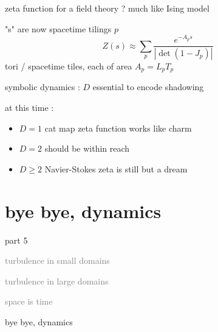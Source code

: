 %
%



\begin{frame}{zeta function for a field theory ? much like Ising model}
\begin{block}{"\po s" are now spacetime tilings $p$}
\[
Z(s) \approx
\sum_{p} \frac{e^{-A_p s}}
              {\left|\det(1-J_p)\right|}
\]
tori / spacetime tiles,
each of area $A_p = L_p T_p$
\end{block}
\begin{block}{symbolic dynamics : $D$\dmn}
essential to encode shadowing
\end{block}

\vfill
at this time :
\begin{itemize}
\item $D=1$ cat map zeta function works like charm
\item $D=2$ {\catlatt} should be within reach
\item $D\geq2$ Navier-Stokes  zeta is still but a dream
\end{itemize}
\end{frame}

\section[bye bye, dynamics]
{bye bye, dynamics}
\begin{frame}{part 5}
\begin{enumerate}
              \item
    \textcolor{gray}{\small
turbulence in small domains
              \item
turbulence in large domains
              \item
\catlatt
              \item
space is time
    }
              \item
    {\Large
bye bye, dynamics
    }
            \end{enumerate}
\end{frame}


